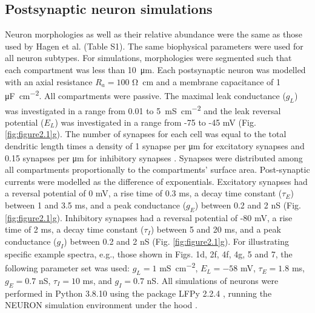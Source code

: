 \subsection{Postsynaptic neuron simulations}
Neuron morphologies as well as their relative abundance were the same as those used by Hagen et al. \cite{Hagen2016} (Table S1). The same biophysical parameters were used for all neuron subtypes. For simulations, morphologies were segmented such that each compartment was less than \qty{10}{\micro\meter}. Each postsynaptic neuron was modelled with an axial resistance $R_a=100$ \unit{\ohm \centi\meter} and a membrane capacitance of 1 \unit{\micro\farad\per\centi\meter\squared}. All compartments were passive. The maximal leak conductance ($g_L$) was investigated in a range from 0.01 to \qty{5}{\milli\siemens\per\centi\meter\squared} and the leak reversal potential ($E_L$) was investigated in a range from -75 to -45 \unit{\milli\volt} (Fig. \ref{fig:figure2.1}g). The number of synapses for each cell was equal to the total dendritic length times a density of 1 synapse per \unit{\micro\meter} for excitatory synapses and 0.15 synapses per \unit{\micro\meter} for inhibitory synapses \cite{Iacaruso2017, Karimi2020, Palmer2012}. Synapses were distributed among all compartments proportionally to the compartments’ surface area. Post-synaptic currents were modelled as the difference of exponentials. Excitatory synapses had a reversal potential of 0 \unit{\milli\volt}, a rise time of 0.3 ms, a decay time constant ($\tau_E$) between 1 and 3.5 ms, and a peak conductance ($g_E$) between 0.2 and 2 \unit{\nano\siemens} (Fig. \ref{fig:figure2.1}g). Inhibitory synapses had a reversal potential of -80 \unit{\milli\volt}, a rise time of 2 ms, a decay time constant ($\tau_I$) between 5 and 20 ms, and a peak conductance ($g_I$) between 0.2 and 2 \unit{\nano\siemens} (Fig. \ref{fig:figure2.1}g). For illustrating specific example spectra, e.g., those shown in Figs. 1d, 2f, 4f, 4g, 5 and 7, the following parameter set was used: $g_L = 1$ \unit{\milli\siemens\per\centi\meter\squared}, $E_L = -58$ \unit{\milli\volt}, $\tau_E = 1.8$ ms, $g_E = 0.7$ \unit{\nano\siemens}, $\tau_I = 10$ \unit{\milli\second}, and $g_I = 0.7$ \unit{\nano\siemens}. All simulations of neurons were performed in Python 3.8.10 using the package LFPy 2.2.4 \cite{Hagen2018}, running the NEURON simulation environment under the hood \cite{Carnevale2006}.

